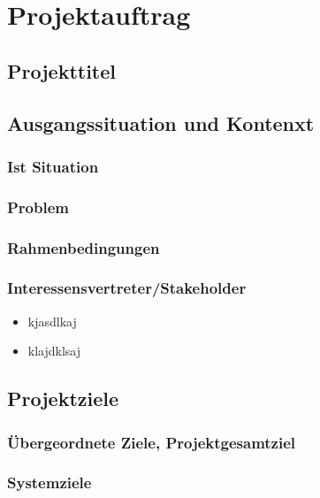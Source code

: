\chapter{Projektauftrag}

\section*{Projekttitel}

\section{Ausgangssituation und Kontenxt}

\subsection{Ist Situation}

\subsection{Problem}

\subsection{Rahmenbedingungen}

\subsection{Interessensvertreter/Stakeholder}

\begin{itemize}

\item kjasdlkaj
\item klajdklsaj

\end{itemize}


\section{Projektziele}

\subsection{Übergeordnete Ziele, Projektgesamtziel}

\subsection{Systemziele}

